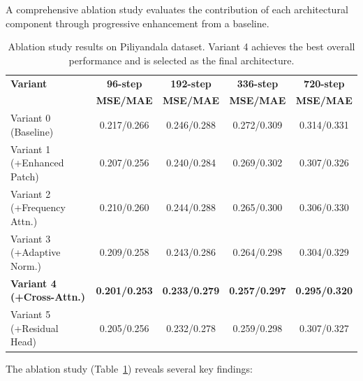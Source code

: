 \documentclass[a4paper,fleqn]{cas-dc}
\begin{document}
A comprehensive ablation study evaluates the contribution of each architectural component through progressive enhancement from a baseline.

\begin{table}[width=.9\linewidth,pos=h]
\caption{Ablation study results on Piliyandala dataset. Variant 4 achieves the best overall performance and is selected as the final architecture.}\label{tab:ablation}
\begin{tabular*}{\tblwidth}{@{} lcccc@{} }
\toprule
\textbf{Variant} & \textbf{96-step} & \textbf{192-step} & \textbf{336-step} & \textbf{720-step} \\
 & \textbf{MSE/MAE} & \textbf{MSE/MAE} & \textbf{MSE/MAE} & \textbf{MSE/MAE} \\
\midrule
Variant 0 (Baseline) & 0.217/0.266 & 0.246/0.288 & 0.272/0.309 & 0.314/0.331\\
Variant 1 (+Enhanced Patch) & 0.207/0.256 & 0.240/0.284 & 0.269/0.302 & 0.307/0.326\\
Variant 2 (+Frequency Attn.) & 0.210/0.260 & 0.244/0.288 & 0.265/0.300 & 0.306/0.330\\
Variant 3 (+Adaptive Norm.) & 0.209/0.258 & 0.243/0.286 & 0.264/0.298 & 0.304/0.329\\
\textbf{Variant 4 (+Cross-Attn.)} & \textbf{0.201/0.253} & \textbf{0.233/0.279} & \textbf{0.257/0.297} & \textbf{0.295/0.320}\\
Variant 5 (+Residual Head) & 0.205/0.256 & 0.232/0.278 & 0.259/0.298 & 0.307/0.327\\
\bottomrule
\end{tabular*}
\end{table}

The ablation study (Table~\ref{tab:ablation}) reveals several key findings:
\end{document}

